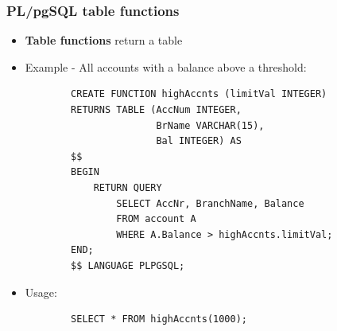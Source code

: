 \subsubsection{PL/pgSQL table functions}
\begin{itemize}[label=\(\rhd\)]
    \item \textbf{Table functions} return a table
    \item Example - All accounts with a balance above a threshold:
    \begin{lstlisting}
        CREATE FUNCTION highAccnts (limitVal INTEGER)
        RETURNS TABLE (AccNum INTEGER,
                       BrName VARCHAR(15),
                       Bal INTEGER) AS
        $$
        BEGIN
            RETURN QUERY
                SELECT AccNr, BranchName, Balance
                FROM account A
                WHERE A.Balance > highAccnts.limitVal;
        END;
        $$ LANGUAGE PLPGSQL;
    \end{lstlisting}
    \item Usage:
    \begin{lstlisting}
        SELECT * FROM highAccnts(1000);
    \end{lstlisting}
\end{itemize}

